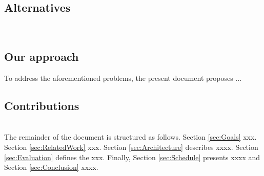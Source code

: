 \subsection{Alternatives}
\noindent\tab [Alternatives]\\

\subsection{Our approach}
\noindent\tab To address the aforementioned problems, the present document proposes ...\\

\subsection{Contributions}
\noindent\tab [Contributions]\\
\noindent\tab The remainder of the document is structured as follows. Section \ref{sec:Goals} xxx. Section \ref{sec:RelatedWork} xxx. Section \ref{sec:Architecture} describes xxxx. Section \ref{sec:Evaluation} defines the xxx. Finally, Section \ref{sec:Schedule} presents xxxx and Section \ref{sec:Conclusion} xxxx.


